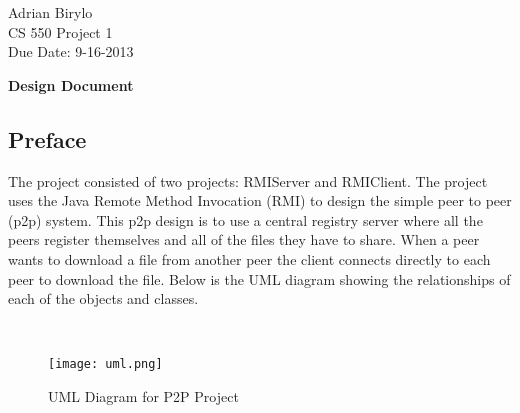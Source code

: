 \documentclass{article}
\begin{document}
\begin{flushright}
Adrian Birylo\\
CS 550 Project 1\\
Due Date: 9-16-2013\\
\end{flushright}

\begin{center}
\textbf{\huge{Design Document}}
\end{center}



\subsection*{Preface}
The project consisted of two projects: RMIServer and RMIClient. The project uses the Java Remote Method Invocation (RMI) to design the simple peer to peer (p2p) system. This p2p design is to use a central registry server where all the peers register themselves and all of the files they have to share. When a peer wants to download a file from another peer the client connects directly to each peer to download the file. Below is the UML diagram showing the relationships of each of the objects and classes. 

\begin{figure}[!h]\
\begin{center}
\texttt{[image: uml.png]}
\caption{UML Diagram for P2P Project}
\end{center}
\end{figure}
\end{document}
